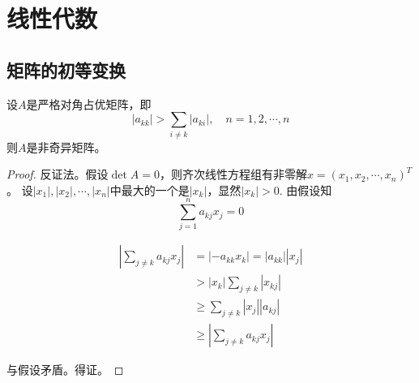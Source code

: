 \chapter{线性代数}

\section{矩阵的初等变换}

\begin{theorem}

    设$A$是严格对角占优矩阵，即
    $$|a_{kk}| > \sum\limits_{i \neq k}{|a_{ki}|}, \quad n = 1, 2, \cdots , n$$
    则$A$是非奇异矩阵。

\end{theorem}

\begin{proof}
    
    反证法。假设$\det A = 0$，则齐次线性方程组有非零解$x = (x_1, x_2, \cdots , x_n)^{T}$。
    设$|x_1|, |x_2|, \cdots , |x_n|$中最大的一个是$|x_k|$，显然$|x_k| > 0$. 由假设知
    $$\sum\limits_{j = 1}^{n}{a_{kj}x_j}  = 0$$
    
    \begin{align*}
        \left| \sum\limits_{j \neq k}{a_{kj}x_j} \right| & = |-a_{kk}x_k| = |a_{kk}||x_j| \\ 
        & > |x_k| \sum\limits_{j \neq k}{|x_{kj}|} \\
        & \geq \sum\limits_{j \neq k}{|x_j||a_{kj}|} \\
        & \geq \left| \sum\limits_{j \neq k}{a_{kj}x_j} \right|
    \end{align*}

    与假设矛盾。得证。
    
\end{proof}